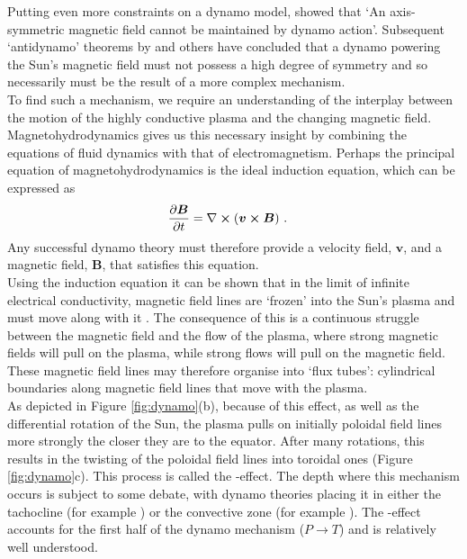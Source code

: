 \documentclass[11pt,a4paper,onecolumn]{report}
\begin{document}
Putting even more constraints on a dynamo model, \citet{cowling1933} showed that
`An axis-symmetric magnetic field cannot be maintained by dynamo action'.
Subsequent `antidynamo' theorems by \citet{backus1956} and others have
concluded that a dynamo powering the Sun's magnetic field must not possess a
high degree of symmetry and so necessarily must be the result of a more complex
mechanism.\\


To find such a mechanism, we require an understanding of the interplay between the
motion of the highly conductive plasma and the changing magnetic field.
Magnetohydrodynamics gives us this necessary insight by combining the
equations of fluid dynamics with that of electromagnetism. Perhaps the principal
equation of magnetohydrodynamics is the ideal induction equation, which can be expressed as
\begin{align}
  \partialderivative{\bm{B}}{t} &=
  \nabla \crossproduct \left(\bm{v}\crossproduct \bm{B}\right)\,.
  \label{eqn:ideal_induction}
\end{align}
Any successful dynamo theory must therefore provide a
velocity field, \(\bm{v}\), and a magnetic field, \(\bm{B}\), that satisfies
this equation. \\

Using the induction equation it can be shown that in the limit of infinite
electrical conductivity, magnetic field lines are `frozen' into the Sun's plasma
and must move along with it \citep{Alfven1943}. The consequence of this is a
continuous struggle between the magnetic field and the flow of the plasma, where
strong magnetic fields will pull on the plasma, while strong flows will pull
on the magnetic field. These magnetic field lines may therefore organise into
`flux tubes': cylindrical boundaries along magnetic field lines that move with
the plasma. \\

As depicted in Figure \ref{fig:dynamo}(b), because of this effect, as well as
the differential rotation of the Sun, the plasma pulls on initially poloidal
field lines more strongly the closer they are to the equator. After many
rotations, this results in the twisting of the poloidal field lines into
toroidal ones (Figure \ref{fig:dynamo}c). This process is called the
\textomega-effect. The depth where this mechanism occurs is subject to some
debate, with dynamo theories placing it in either the tachocline (for example
\citealt{deluca_dynamo_1988}) or the convective zone (for example
\citealp{chen_emergence_2017}). The \textomega-effect accounts for the first
half of the dynamo mechanism (\(P \rightarrow T\)) and is relatively well
understood.\\
\end{document}
